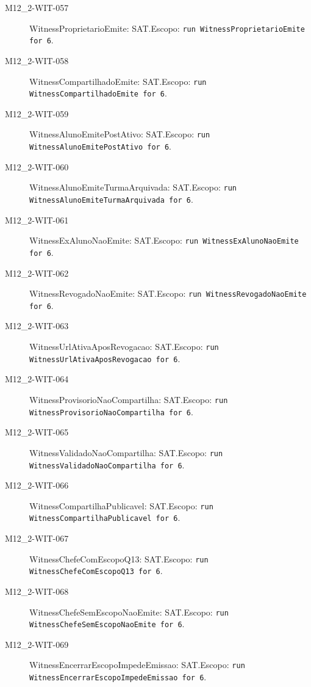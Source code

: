 \begin{description}
\item[M12\_2-WIT-057] WitnessProprietarioEmite: SAT.\newline Escopo: \texttt{run WitnessProprietarioEmite for 6}.
\item[M12\_2-WIT-058] WitnessCompartilhadoEmite: SAT.\newline Escopo: \texttt{run WitnessCompartilhadoEmite for 6}.
\item[M12\_2-WIT-059] WitnessAlunoEmitePostAtivo: SAT.\newline Escopo: \texttt{run WitnessAlunoEmitePostAtivo for 6}.
\item[M12\_2-WIT-060] WitnessAlunoEmiteTurmaArquivada: SAT.\newline Escopo: \texttt{run WitnessAlunoEmiteTurmaArquivada for 6}.
\item[M12\_2-WIT-061] WitnessExAlunoNaoEmite: SAT.\newline Escopo: \texttt{run WitnessExAlunoNaoEmite for 6}.
\item[M12\_2-WIT-062] WitnessRevogadoNaoEmite: SAT.\newline Escopo: \texttt{run WitnessRevogadoNaoEmite for 6}.
\item[M12\_2-WIT-063] WitnessUrlAtivaAposRevogacao: SAT.\newline Escopo: \texttt{run WitnessUrlAtivaAposRevogacao for 6}.
\item[M12\_2-WIT-064] WitnessProvisorioNaoCompartilha: SAT.\newline Escopo: \texttt{run WitnessProvisorioNaoCompartilha for 6}.
\item[M12\_2-WIT-065] WitnessValidadoNaoCompartilha: SAT.\newline Escopo: \texttt{run WitnessValidadoNaoCompartilha for 6}.
\item[M12\_2-WIT-066] WitnessCompartilhaPublicavel: SAT.\newline Escopo: \texttt{run WitnessCompartilhaPublicavel for 6}.
\item[M12\_2-WIT-067] WitnessChefeComEscopoQ13: SAT.\newline Escopo: \texttt{run WitnessChefeComEscopoQ13 for 6}.
\item[M12\_2-WIT-068] WitnessChefeSemEscopoNaoEmite: SAT.\newline Escopo: \texttt{run WitnessChefeSemEscopoNaoEmite for 6}.
\item[M12\_2-WIT-069] WitnessEncerrarEscopoImpedeEmissao: SAT.\newline Escopo: \texttt{run WitnessEncerrarEscopoImpedeEmissao for 6}.

\end{description}
